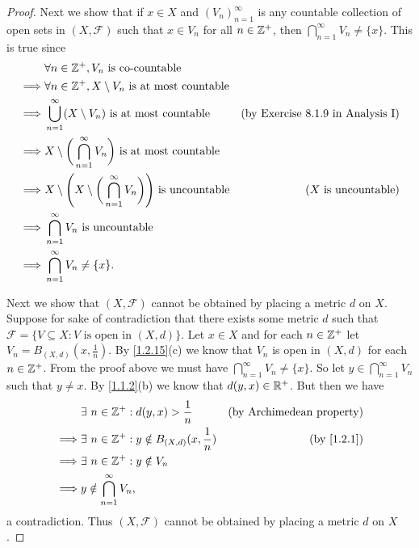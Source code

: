 \begin{proof}
  Next we show that if \(x \in X\) and \((V_n)_{n = 1}^\infty\) is any countable collection of open sets in \((X, \mathcal{F})\) such that \(x \in V_n\) for all \(n \in \mathbb{Z}^+\), then \(\bigcap_{n = 1}^\infty V_n \neq \{x\}\).
  This is true since
  \begin{align*}
             & \forall n \in \mathbb{Z}^+, V_n \text{ is co-countable}                                                                                              \\
    \implies & \forall n \in \mathbb{Z}^+, X \setminus V_n \text{ is at most countable}                                                                             \\
    \implies & \bigcup_{n = 1}^\infty (X \setminus V_n) \text{ is at most countable}                             & \text{(by Exercise 8.1.9 in Analysis I)} \\
    \implies & X \setminus \bigg(\bigcap_{n = 1}^\infty V_n\bigg) \text{ is at most countable}                                                              \\
    \implies & X \setminus \Bigg(X \setminus \bigg(\bigcap_{n = 1}^\infty V_n\bigg)\Bigg) \text{ is uncountable} & \text{(\(X\) is uncountable)}            \\
    \implies & \bigcap_{n = 1}^\infty V_n \text{ is uncountable}                                                                                            \\
    \implies & \bigcap_{n = 1}^\infty V_n \neq \{x\}.
  \end{align*}

  Next we show that \((X, \mathcal{F})\) cannot be obtained by placing a metric \(d\) on \(X\).
  Suppose for sake of contradiction that there exists some metric \(d\) such that \(\mathcal{F} = \{V \subseteq X : V \text{ is open in } (X, d)\}\).
  Let \(x \in X\) and for each \(n \in \mathbb{Z}^+\) let \(V_n = B_{(X, d)}(x, \frac{1}{n})\).
  By \cref{1.2.15}(c) we know that \(V_n\) is open in \((X, d)\) for each \(n \in \mathbb{Z}^+\).
  From the proof above we must have \(\bigcap_{n = 1}^\infty V_n \neq \{x\}\).
  So let \(y \in \bigcap_{n = 1}^\infty V_n\) such that \(y \neq x\).
  By \cref{1.1.2}(b) we know that \(d(y, x) \in \mathbb{R}^+\).
  But then we have
  \begin{align*}
             & \exists\ n \in \Z^+ : d(y, x) > \frac{1}{n}               & \text{(by Archimedean property)} \\
    \implies & \exists\ n \in \Z^+ : y \notin B_{(X, d)}(x, \frac{1}{n}) & \text{(by \cref{1.2.1})}         \\
    \implies & \exists\ n \in \Z^+ : y \notin V_n                                                           \\
    \implies & y \notin \bigcap_{n = 1}^\infty V_n,
  \end{align*}
  a contradiction.
  Thus \((X, \mathcal{F})\) cannot be obtained by placing a metric \(d\) on \(X\).


\end{proof}
